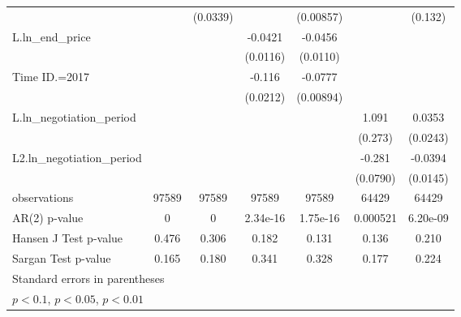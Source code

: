 {\begin{tabular}{l*{6}{c}}
                    &                     &    (0.0339)         &                     &   (0.00857)         &                     &     (0.132)         \\
\addlinespace
L.ln\_end\_price      &                     &                     &     -0.0421\sym{***}&     -0.0456\sym{***}&                     &                     \\
                    &                     &                     &    (0.0116)         &    (0.0110)         &                     &                     \\
\addlinespace
Time ID.=2017       &                     &                     &      -0.116\sym{***}&     -0.0777\sym{***}&                     &                     \\
                    &                     &                     &    (0.0212)         &   (0.00894)         &                     &                     \\
\addlinespace
L.ln\_negotiation\_period&                     &                     &                     &                     &       1.091\sym{***}&      0.0353         \\
                    &                     &                     &                     &                     &     (0.273)         &    (0.0243)         \\
\addlinespace
L2.ln\_negotiation\_period&                     &                     &                     &                     &      -0.281\sym{***}&     -0.0394\sym{***}\\
                    &                     &                     &                     &                     &    (0.0790)         &    (0.0145)         \\
\midrule
observations        &       97589         &       97589         &       97589         &       97589         &       64429         &       64429         \\
AR(2) p-value       &           0         &           0         &    2.34e-16         &    1.75e-16         &    0.000521         &    6.20e-09         \\
Hansen J Test p-value&       0.476         &       0.306         &       0.182         &       0.131         &       0.136         &       0.210         \\
Sargan Test p-value &       0.165         &       0.180         &       0.341         &       0.328         &       0.177         &       0.224         \\
\bottomrule
\multicolumn{7}{l}{\footnotesize Standard errors in parentheses}\\
\multicolumn{7}{l}{\footnotesize \sym{*} \(p<0.1\), \sym{**} \(p<0.05\), \sym{***} \(p<0.01\)}\\
\end{tabular}
}
